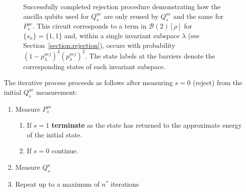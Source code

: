\documentclass[aps,floatfix,10pt,amssymb,amsfont,amsmath,superscriptaddress,float,nofootinbib,longbibliography,nobalancelastpage,twocolumn]{revtex4-2}
\begin{document}
\begin{figure}
\caption{Successfully completed rejection procedure demonstrating how the ancilla qubits used for $Q_s^{ae}$ are only reused by $Q_s^{ae}$ and the same for $P_s^{ae}$. This circuit corresponds to a term in $\mathcal{B}(2)[\rho]$ for $\{s_n\} = \{1,1\}$ and, within a single invariant subspace $\lambda$ (see Section~\ref{section:rejection}), occurs with probability $(1-p^{aej}_{\lambda})^4(p^{aej}_{\lambda})^2$. The state labels at the barriers denote the corresponding states of each invariant subspace.}
\label{fig:fullcircuit}
\end{figure}

The iterative process proceeds as follows after measuring $s=0$ (reject) from the initial $Q_s^{ae}$ measurement: 
\begin{enumerate}
    \item Measure $P_s^{ae}$
        \begin{enumerate}
            \item If $s=1$ \textbf{terminate} as the state has returned to the approximate energy of the initial state.
            \item If $s=0$ continue.
        \end{enumerate}
    \item Measure $Q_s^a$
    \item Repeat up to a maximum of $n^*$ iterations
\end{enumerate}
\end{document}
